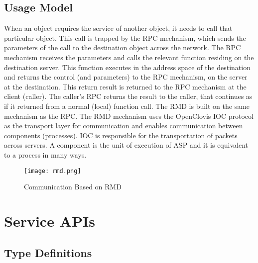 \begin{flushleft}
\section{Usage Model}
When an object requires the service of another object, it needs to call that particular object. This call is trapped by the RPC mechanism, which sends the
parameters of the call to the destination object across the network. The RPC mechanism receives the parameters and calls the relevant function residing 
on the destination server. This function executes in the address space of the destination and returns the control (and parameters) to the RPC mechanism, 
on the server at the destination. 
This return result is returned to the RPC mechanism at the client (caller). The caller's RPC returns the result to the caller, that continues as if it 
returned from a normal (local) function call.
The RMD is built on the same mechanism as the RPC. The RMD mechanism uses the OpenClovis IOC protocol as the transport layer for communication and
enables communication between components (processes). IOC is responsible for the transportation of packets across servers. A component is the unit of 
execution of ASP and it is equivalent to a process in many ways.
\begin{figure}[htp]
\centering
\texttt{[image: rmd.png]}
\caption{Communication Based on RMD}
\end{figure}


\chapter{Service APIs}



\section{Type Definitions}


\end{flushleft}
